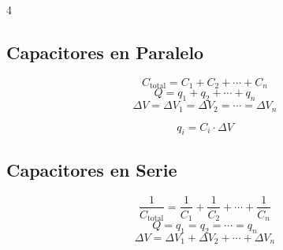 \documentclass[9pt, landscape, letterpaper]{extarticle}
\begin{document}
\begin{multicols}{4}
  \subsection{Capacitores en Paralelo}

  \begin{formulabox}
    $$C_{\text{total}} = C_1 + C_2 + \cdots + C_n$$
    $$Q = q_1 + q_2 + \cdots + q_n$$
    $$\Delta V = \Delta V_1 = \Delta V_2 = \cdots = \Delta V_n$$
  \end{formulabox}

  \begin{despejesbox}
    $$q_i = C_i \cdot \Delta V$$
  \end{despejesbox}

  \subsection{Capacitores en Serie}

  \begin{formulabox}
    $$\frac{1}{C_{\text{total}}} = \frac{1}{C_1} + \frac{1}{C_2} + \cdots + \frac{1}{C_n}$$
    $$Q = q_1 = q_2 = \cdots = q_n$$
    $$\Delta V = \Delta V_1 + \Delta V_2 + \cdots + \Delta V_n$$
  \end{formulabox}

\end{multicols}

\end{document}
